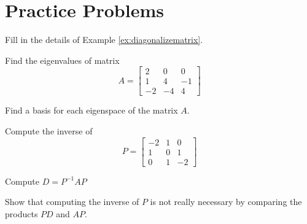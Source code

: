 \documentclass{ximera}
\begin{document}
\section*{Practice Problems}
\begin{problem}\label{prob:ex:diagonalizematrix}
    Fill in the details of Example \ref{ex:diagonalizematrix}.
\begin{question}\label{prob:ex:diagonalizematrix1}
Find the eigenvalues of matrix 
\begin{equation*}
A=\begin{bmatrix}
2 & 0 & 0 \\
1 & 4 & -1 \\
-2 & -4 & 4
\end{bmatrix}
\end{equation*}
\end{question} 

\begin{question}\label{prob:ex:diagonalizematrix2}
Find a basis for each eigenspace of the matrix $A$.
\end{question}

\begin{question}\label{prob:ex:diagonalizematrix3}
Compute the inverse of \begin{equation*}
P=
\begin{bmatrix}
-2 & 1 & 0 \\
1 & 0 & 1 \\
0 & 1 & -2
\end{bmatrix}
\end{equation*}
\end{question}

\begin{question}\label{prob:ex:diagonalizematrix5}
Compute $D=P^{-1}AP$
\end{question}

\begin{question}\label{prob:ex:diagonalizematrix4}
Show that computing the inverse of $P$ is not really necessary by comparing the products  $PD$ and $AP$.
\end{question}
\end{problem}
\end{document}
